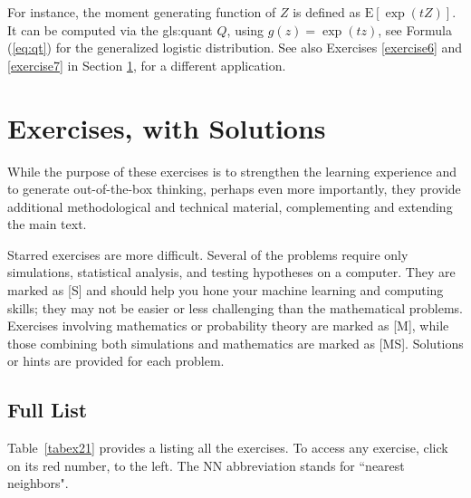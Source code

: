 \documentclass[10pt]{article}
\begin{document}
For instance, the moment generating function of $Z$ is defined as $\mbox{E}[\exp(tZ)]$. It can be computed via the \gls{gls:quant} $Q$,  using $g(z)=\exp(tz)$, see Formula (\ref{eq:qt}) for the generalized logistic distribution. See also Exercises \ref{exercise6} 
and \ref{exercise7} in Section \ref{ex:1}, for a different application.

\pagebreak

\section{Exercises, with Solutions}\label{ex:1}

While the purpose of these exercises is to  strengthen the learning experience and to generate out-of-the-box thinking, perhaps even more importantly, they provide additional methodological and technical material, complementing and extending the main text. 

Starred exercises are more difficult. Several of the problems require only simulations, statistical analysis, and testing hypotheses on a computer. They are marked as [S] and should help you hone your machine learning and computing skills; they may not be easier or less challenging than the mathematical problems. Exercises involving mathematics or probability theory are marked as [M], while those combining both simulations and mathematics are marked as [MS]. Solutions or hints are provided for each problem.  

\subsection{Full List}\label{se12}

Table~\ref{tabex21} provides a listing all the exercises. To access any exercise, click on its red number, to the left. The NN abbreviation stands for ``nearest neighbors".
\end{document}
